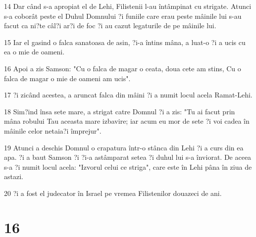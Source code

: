 \par 14 Dar când s-a apropiat el de Lehi, Filistenii l-au întâmpinat cu strigate. Atunci s-a coborât peste el Duhul Domnului ?i funiile care erau peste mâinile lui s-au facut ca ni?te câl?i ar?i de foc ?i au cazut legaturile de pe mâinile lui.
\par 15 Iar el gasind o falca sanatoasa de asin, ?i-a întins mâna, a luat-o ?i a ucis cu ea o mie de oameni.
\par 16 Apoi a zis Samson: "Cu o falca de magar o ceata, doua cete am stins, Cu o falca de magar o mie de oameni am ucis".
\par 17 ?i zicând acestea, a aruncat falca din mâini ?i a numit locul acela Ramat-Lehi.
\par 18 Sim?ind însa sete mare, a strigat catre Domnul ?i a zis: "Tu ai facut prin mâna robului Tau aceasta mare izbavire; iar acum eu mor de sete ?i voi cadea în mâinile celor netaia?i împrejur".
\par 19 Atunci a deschis Domnul o crapatura într-o stânca din Lehi ?i a curs din ea apa. ?i a baut Samson ?i ?i-a astâmparat setea ?i duhul lui s-a înviorat. De aceea s-a ?i numit locul acela: "Izvorul celui ce striga", care este în Lehi pâna în ziua de astazi.
\par 20 ?i a fost el judecator în Israel pe vremea Filistenilor douazeci de ani.

\chapter{16}

